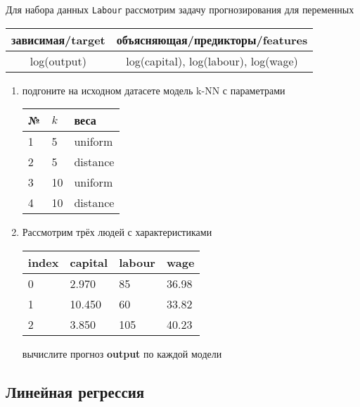\begin{exercise}
Для набора данных \texttt{Labour} рассмотрим задачу прогнозирования
для переменных
\begin{center}
	\begin{tabular}{|c|c|}\hline
		зависимая/target & объясняющая/предикторы/features \\ \hline
		log(output) & log(capital), log(labour), log(wage) \\ \hline
	\end{tabular}
\end{center}
\begin{enumerate}
	\item подгоните на исходном датасете модель k-NN с параметрами
	\begin{center}
		\begin{tabular}{|l|l|l|}\hline
		№ & \(k\) & веса \\ \hline
		1 & 5 & uniform \\
		2 & 5 & distance \\
		3 & 10 & uniform \\
		4 & 10 & distance \\ \hline
		\end{tabular}
	\end{center}
	\item Рассмотрим трёх людей с характеристиками
	\begin{center}
		\begin{tabular}{|l||l|l|l|}\hline
			index & capital & labour & wage \\ \hline\hline
			0 & 2.970 & 85 & 36.98\\
			1 & 10.450 & 60 & 33.82  \\
			2 & 3.850 & 105 & 40.23\\ \hline
		\end{tabular}
	\end{center}
	вычислите прогноз \textbf{output} по каждой модели
\end{enumerate}
\end{exercise}

\subsection{Линейная регрессия}

